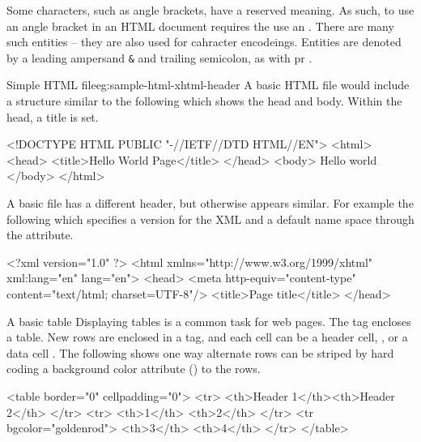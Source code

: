 Some characters, such as angle brackets, have a reserved meaning.  As
such, to use an angle bracket in an HTML document requires the use an
.  There are many such entities -- they are
also used for cahracter encodeings. Entities are
denoted by a leading ampersand \texttt{\&} and trailing semicolon, as
with  pr . 


\begin{example}{Simple HTML file}{eg:sample-html-xhtml-header}
  A basic HTML file would include a structure similar to the following
  which shows the head and body. Within the head, a title is set.
  \begin{HTMLinput}
<!DOCTYPE HTML PUBLIC "-//IETF//DTD HTML//EN">
<html>
  <head>
    <title>Hello World Page</title>
  </head>
  <body>
    Hello world
  </body>
</html>
\end{HTMLinput}

A basic  file has a different header, but otherwise
appears similar. For example the
following which specifies a version for the XML and a default name
space through the  attribute.
\begin{HTMLinput}
<?xml version="1.0" ?>
<html xmlns="http://www.w3.org/1999/xhtml" xml:lang="en" 
  lang="en">
<head>
<meta http-equiv="content-type" 
  content="text/html; charset=UTF-8"/>
<title>Page title</title>
</head>
\end{HTMLinput}

\end{example}

\begin{example}{A basic table}{}
  Displaying tables is a common task for web pages. The 
  tag encloses a table. New rows are enclosed in a  tag,
  and each cell can be a header cell, , or a data cell
  . The following shows one way alternate rows can be
  striped by hard coding a background color attribute ()
  to the rows.
  \begin{HTMLinput}
<table border="0" cellpadding="0">
  <tr>
    <th>Header 1</th><th>Header 2</th>
  </tr>
  <tr>
    <th>1</th> <th>2</th>
  </tr>
  <tr bgcolor="goldenrod">
    <th>3</th> <th>4</th>
  </tr>
</table>
 \end{HTMLinput}
\end{example}

